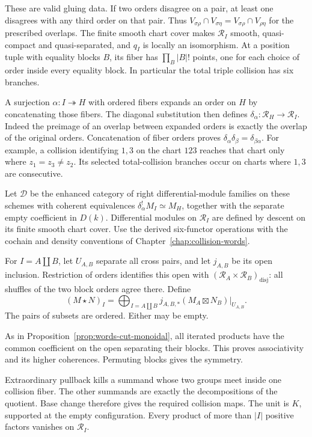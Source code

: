These are valid gluing data. If two orders disagree
on a pair, at least one disagrees with any third
order on that pair. Thus
$V_{\sigma\rho}\cap V_{\sigma\eta}
=V_{\sigma\rho}\cap V_{\rho\eta}$ for the prescribed
overlaps. The finite smooth chart cover makes
$\mathscr R_I$ smooth, quasi-compact and quasi-separated,
and $q_I$ is locally an isomorphism.
At a position tuple with equality blocks $B$, its
fiber has $\prod_B|B|!$ points, one for each choice
of order inside every equality block.
In particular the total triple collision has six
branches.

A surjection $\alpha:I\twoheadrightarrow H$ with
ordered fibers expands an order on $H$ by concatenating
those fibers. The diagonal substitution then defines
$\delta_\alpha:\mathscr R_H\to\mathscr R_I$.
Indeed the preimage of an overlap between expanded
orders is exactly the overlap of the original orders.
Concatenation of fiber orders proves
\mbox{$\delta_\alpha\delta_\beta=\delta_{\beta\alpha}$}.
For example, a collision identifying $1,3$ on the
chart $123$ reaches that chart only where $z_1=z_3\ne z_2$.
Its selected total-collision branches occur on charts
where $1,3$ are consecutive.

Let $\mathscr D$ be the enhanced category of right
differential-module families on these schemes with
coherent equivalences
$\delta_\alpha^!M_I\simeq M_H$, together with the
separate empty coefficient in $D(k)$.
Differential modules on $\mathscr R_I$ are defined by
descent on its finite smooth chart cover.
Use the derived six-functor operations with the
cochain and density conventions of
Chapter~\ref{chap:collision-words}.

For $I=A\amalg B$, let $U_{A,B}$ separate all cross
pairs, and let $j_{A,B}$ be its open inclusion.
Restriction of orders identifies this open with
$(\mathscr R_A\times\mathscr R_B)_{\mathrm{disj}}$:
all shuffles of the two block orders agree there.
Define
\begin{equation}\label{cbc:va:symmetric-convolution}
 (M\star N)_I=
 \bigoplus_{I=A\amalg B}
 j_{A,B,*}(M_A\boxtimes N_B)|_{U_{A,B}}.
\end{equation}
The pairs of subsets are ordered. Either may be empty.

As in Proposition~\ref{prop:words-cut-monoidal},
all iterated products have the common coefficient
on the open separating their blocks. This proves
associativity and its higher coherences. Permuting
blocks gives the symmetry.

Extraordinary pullback
kills a summand whose two groups meet inside one
collision fiber. The other summands are exactly
the decompositions of the quotient. Base change
therefore gives the required collision maps.
The unit is $K$, supported at the empty configuration.
Every product of more than $|I|$ positive factors
vanishes on $\mathscr R_I$.

